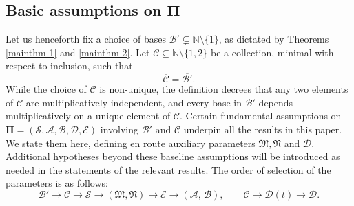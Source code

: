 \documentclass[12pt, twoside]{article}
\theoremstyle{definition}
\numberwithin{equation}{section}
\begin{document}
\subsection{Basic assumptions on $\pmb{\Pi}$} \label{preliminary-Pi-choice-section}
Let us henceforth fix a choice of bases $\mathscr{B}' \subsetneq \mathbb N \setminus \{1\}$, as dictated by Theorems \ref{mainthm-1} and \ref{mainthm-2}. Let $\mathscr{C} \subseteq \mathbb N \setminus \{1, 2\}$ be a collection, minimal with respect to inclusion, such that \begin{equation} \label{what-is-C} 
\overline{\mathscr{C}} = \overline{\mathscr{B}'}.
\end{equation} 
While the choice of $\mathscr{C}$ is non-unique, the definition decrees that any two elements of $\mathscr{C}$ are multiplicatively independent, and every base in $\mathscr{B}'$ depends multiplicatively on a unique element of $\mathscr{C}$. Certain fundamental assumptions on $\pmb{\Pi}= (\mathcal S, \mathcal A, \mathcal B, \mathcal D, \mathcal E)$ involving $\mathscr{B}'$ and $\mathscr{C}$ underpin all the results in this paper. We state them here, defining en route auxiliary parameters $\mathfrak M, \mathfrak N$ and $\mathscr{D}$. Additional hypotheses beyond these baseline assumptions will be introduced as needed in the statements of the relevant results.  The order of selection of the parameters is as follows: 
\[\mathscr{B}' \to \mathscr{C} \to \mathcal{S} \to (\mathfrak M, \mathfrak N) \to \mathcal{E} \to (\mathcal{A},\,\mathcal{B}),\qquad \mathscr{C} \to \mathscr{D}(t) \to \mathcal{D}. \]
\vskip0.1in 
\end{document}
